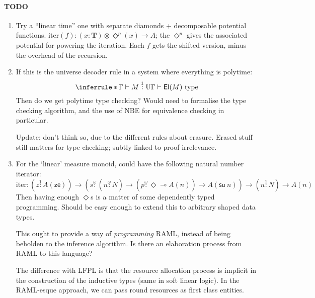 \documentclass{workingnote}
\begin{document}
\paragraph{TODO}
\begin{enumerate}
\item Try a ``linear time'' one with separate diamonds + decomposable
  potential functions.
  $\mathrm{iter}(f) : (x : \mathbf{T}) \otimes \Diamond^{p}(x) \to A$;
  the $\Diamond^p$ gives the associated potential for powering the
  iteration. Each $f$ gets the shifted version, minus the overhead of
  the recursion.
\item If this is the universe decoder rule in a system where
  everything is polytime:
  \begin{displaymath}
    \inferrule*
    {\Gamma \vdash M \stackrel1: \mathrm{U}}
    {\Gamma \vdash \mathsf{El}(M)~\mathrm{type}}
  \end{displaymath}
  Then do we get polytime type checking? Would need to formalise the
  type checking algorithm, and the use of NBE for equivalence checking
  in particular.

  Update: don't think so, due to the different rules about
  erasure. Erased stuff still matters for type checking; subtly linked
  to proof irrelevance.
\item For the `linear' measure monoid, could have the following
  natural number iterator:
  \begin{displaymath}
    \mathrm{iter} : (z \stackrel1: A(\mathsf{ze})) \to (s \stackrel\omega: (n \stackrel\omega: N) \to (p \stackrel\omega: \Diamond \multimap A(n)) \to A(\mathsf{su}~n)) \to (n \stackrel1: N) \to A(n)
  \end{displaymath}
  Then having enough $\Diamond$s is a matter of some dependently typed
  programming. Should be easy enough to extend this to arbitrary
  shaped data types.

  This ought to provide a way of \emph{programming} RAML, instead of
  being beholden to the inference algorithm. Is there an elaboration
  process from RAML to this language?

  The difference with LFPL is that the resource allocation process is
  implicit in the construction of the inductive types (same in soft
  linear logic). In the RAML-esque approach, we can pass round
  resources as first class entities.
\end{enumerate}

\tableofcontents

\newpage
\end{document}
